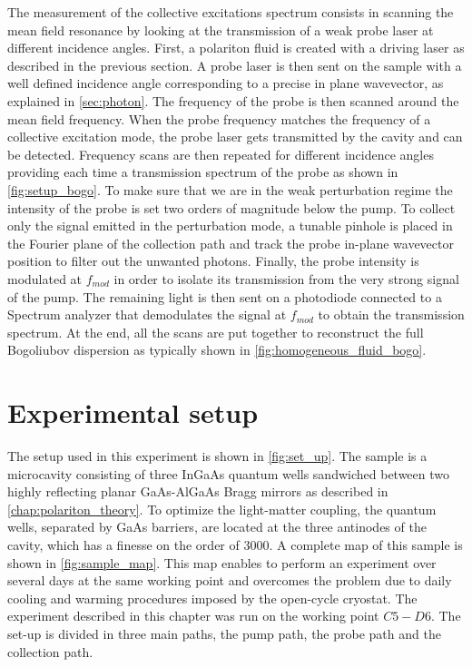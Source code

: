 The measurement of the collective excitations spectrum consists in scanning the mean field resonance by looking at the transmission of a weak probe laser at different incidence angles. First, a polariton fluid is created with a driving laser as described in the previous section. A probe laser is then sent on the sample with a well defined incidence angle corresponding to a precise in plane wavevector, as explained in \autoref{sec:photon}. The frequency of 
the probe is then scanned around the mean field frequency. When the probe frequency matches the frequency of a collective excitation mode, the probe laser gets transmitted by the cavity and can be detected. Frequency scans are then repeated for different incidence angles providing each time a transmission spectrum of the probe as shown in \autoref{fig:setup_bogo}. 
To make sure that we are in the weak perturbation regime the intensity of the probe is set two orders of magnitude below the pump. To collect only the signal emitted in the perturbation mode, a tunable pinhole is placed in the Fourier plane of the collection path and track the probe in-plane wavevector position to filter out the unwanted photons. Finally, the probe intensity is modulated at $f_{mod}$ in order to isolate its transmission from the very strong signal of the pump. The remaining light is then sent on
a photodiode connected to a Spectrum analyzer that demodulates the signal at $f_{mod}$ to obtain the transmission spectrum. At the end, all the scans are put together to reconstruct the full Bogoliubov dispersion as typically shown in \autoref{fig:homogeneous_fluid_bogo}.

\section{Experimental setup}
The setup used in this experiment is shown in \autoref{fig:set_up}. The sample is a microcavity consisting of three InGaAs quantum wells sandwiched between two highly reflecting planar GaAs-AlGaAs Bragg mirrors as described in \autoref{chap:polariton_theory}.
To optimize the light-matter coupling, the quantum wells, separated by GaAs barriers, are located at the three antinodes of the cavity, which has a finesse on the order of 3000. A complete map of this sample 
is shown in \autoref{fig:sample_map}. This map enables to perform an experiment over several days at the same working point and overcomes the problem due to daily cooling and warming procedures imposed by the open-cycle cryostat.
 The experiment described in this chapter was run on the working point $C5-D6$.
 The set-up is divided in three main paths, the pump path, the probe path and the collection path.



